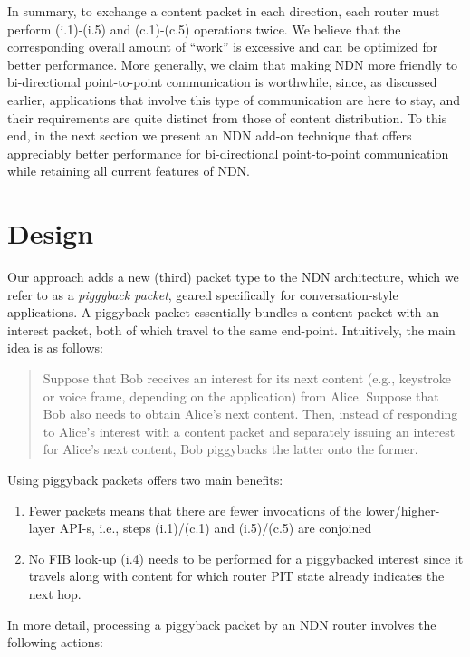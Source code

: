 \documentclass[conference]{IEEEtran}
\begin{document}
In summary, to exchange a content packet in each direction, each router must perform (i.1)-(i.5)
and (c.1)-(c.5) operations twice. We believe that the corresponding overall 
amount of ``work'' is excessive and can be optimized for better performance. 
More generally, we claim that making NDN more friendly to bi-directional point-to-point 
communication is worthwhile, since, as discussed earlier, applications that involve this
type of communication are here to stay, and their requirements are quite distinct from those
of content distribution. To this end, in the next section we present an NDN add-on 
technique that offers appreciably better performance for bi-directional point-to-point 
communication while retaining all current features of NDN. 

\section{Design}
\label{sec:design}
Our approach adds a new (third) packet type to the NDN architecture, 
which we refer to as a {\em piggyback packet}, geared specifically for 
conversation-style applications. A piggyback packet essentially bundles  
a content packet with an interest packet, both of which travel to the same
end-point. Intuitively, the main idea is as follows: 
\begin{quote}
Suppose that Bob receives an interest for its next content (e.g., keystroke or 
voice frame, depending on the application) from Alice. Suppose that Bob also needs 
to obtain Alice's next content. Then, instead of responding to Alice's interest with a 
content packet and separately issuing an interest for Alice's next content, Bob piggybacks 
the latter onto the former. 
\end{quote}
Using piggyback packets offers two main benefits:
\begin{enumerate}
\item Fewer packets means
that there are fewer invocations of the lower/higher-layer API-s, i.e., steps (i.1)/(c.1) and
(i.5)/(c.5) are conjoined
\item No FIB look-up (i.4) needs to be performed for a piggybacked interest 
since it travels along with content for which router PIT state already
indicates the next hop. 
\end{enumerate}
In more detail, processing a piggyback packet by an NDN router
involves the following actions: \\
\end{document}
